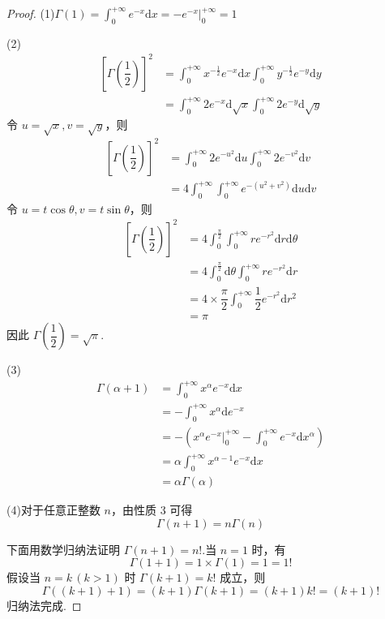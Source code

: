 \begin{proof}
    (1)$\Gamma(1) = \displaystyle\int_{0}^{+\infty} e^{-x} \text{d}x = -e^{-x} \Big|_0^{+\infty} = 1$

    (2)
    $$
    \begin{aligned}
        \left[ \Gamma(\dfrac{1}{2}) \right]^2 &= \int_{0}^{+\infty} x^{-\frac{1}{2}} e^{-x} \text{d}x \int_{0}^{+\infty} y^{-\frac{1}{2}} e^{-y} \text{d}y \\
        &= \int_{0}^{+\infty} 2 e^{-x} \text{d} \sqrt{x} \int_{0}^{+\infty} 2 e^{-y} \text{d} \sqrt{y}
    \end{aligned}
    $$
    令 $u = \sqrt{x}, v = \sqrt{y}$，则
    $$
    \begin{aligned}
        \left[ \Gamma(\dfrac{1}{2}) \right]^2 &= \int_{0}^{+\infty} 2 e^{-u^2} \text{d}u \int_{0}^{+\infty} 2 e^{-v^2} \text{d}v \\
        &= 4 \int_{0}^{+\infty} \int_{0}^{+\infty} e^{-(u^2 + v^2)} \text{d}u \text{d}v
    \end{aligned}
    $$
    令 $u = t \cos\theta, v = t \sin\theta$，则
    $$
    \begin{aligned}
        \left[ \Gamma(\dfrac{1}{2}) \right]^2 &= 4 \int_{0}^{\frac{\pi}{2}} \int_{0}^{+\infty} r e^{-r^2} \text{d}r \text{d} \theta \\
        &= 4 \int_{0}^{\frac{\pi}{2}} \text{d} \theta \int_{0}^{+\infty} r e^{-r^2} \text{d}r \\
        &= 4 \times \dfrac{\pi}{2} \int_{0}^{+\infty} \dfrac{1}{2} e^{-r^2} \text{d}r^2 \\
        &= \pi
    \end{aligned}
    $$
    因此 $\Gamma(\dfrac{1}{2}) = \sqrt{\pi}$.

    \vspace{0.5em}

    (3)
    $$
    \begin{aligned}
        \Gamma(\alpha + 1) &= \int_{0}^{+\infty} x^{\alpha} e^{-x} \text{d}x \\
        &= -\int_{0}^{+\infty} x^{\alpha} \text{d} e^{-x} \\
        &= -\left( x^{\alpha} e^{-x} \Big|_0^{+\infty} - \int_{0}^{+\infty} e^{-x} \text{d} x^{\alpha} \right) \\
        &= \alpha \int_{0}^{+\infty} x^{\alpha - 1} e^{-x} \text{d}x \\
        &= \alpha \Gamma(\alpha)
    \end{aligned}
    $$

    (4)对于任意正整数 $n$，由性质 3 可得
    $$
    \Gamma(n+1) = n \Gamma(n)
    $$

    下面用数学归纳法证明 $\Gamma(n+1) = n!$.当 $n=1$ 时，有
    $$
    \Gamma(1+1) = 1 \times \Gamma(1) = 1 = 1!
    $$
    假设当 $n = k \, (k>1)$ 时 $\Gamma(k+1) = k!$ 成立，则
    $$
    \Gamma((k+1)+1) = (k+1) \Gamma(k+1) = (k+1) k! = (k+1)!
    $$
    归纳法完成.
\end{proof}

